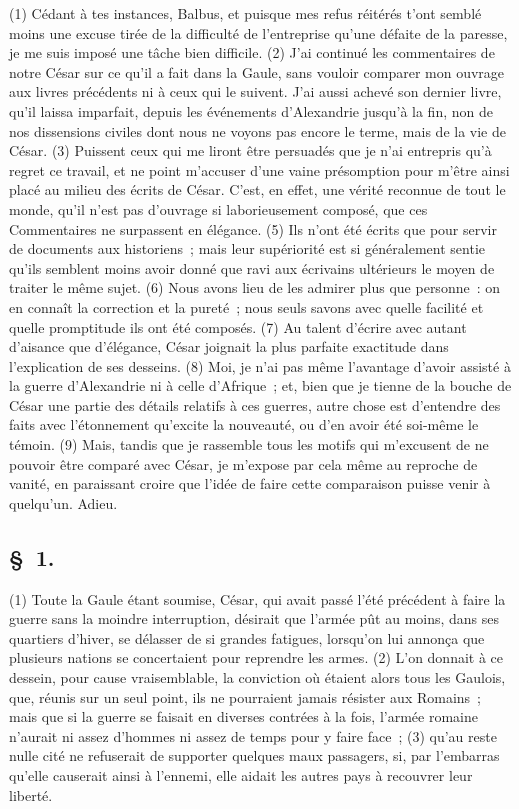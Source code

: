 \documentclass[french,twoside]{book} %
\begin{document}
\noindent (1) Cédant à tes instances, Balbus, et puisque mes refus réitérés t’ont semblé moins une excuse tirée de la difficulté de l’entreprise qu’une défaite de la paresse, je me suis imposé une tâche bien difficile. (2) J'ai continué les commentaires de notre César sur ce qu’il a fait dans la Gaule, sans vouloir comparer mon ouvrage aux livres précédents ni à ceux qui le suivent. J'ai aussi achevé son dernier livre, qu’il laissa imparfait, depuis les événements d’Alexandrie jusqu’à la fin, non de nos dissensions civiles dont nous ne voyons pas encore le terme, mais de la vie de César. (3) Puissent ceux qui me liront être persuadés que je n’ai entrepris qu’à regret ce travail, et ne point m’accuser d’une vaine présomption pour m’être ainsi placé au milieu des écrits de César. C'est, en effet, une vérité reconnue de tout le monde, qu’il n’est pas d’ouvrage si laborieusement composé, que ces Commentaires ne surpassent en élégance. (5) Ils n’ont été écrits que pour servir de documents aux historiens ; mais leur supériorité est si généralement sentie qu’ils semblent moins avoir donné que ravi aux écrivains ultérieurs le moyen de traiter le même sujet. (6) Nous avons lieu de les admirer plus que personne : on en connaît la correction et la pureté ; nous seuls savons avec quelle facilité et quelle promptitude ils ont été composés. (7) Au talent d’écrire avec autant d’aisance que d’élégance, César joignait la plus parfaite exactitude dans l’explication de ses desseins. (8) Moi, je n’ai pas même l’avantage d’avoir assisté à la guerre d’Alexandrie ni à celle d’Afrique ; et, bien que je tienne de la bouche de César une partie des détails relatifs à ces guerres, autre chose est d’entendre des faits avec l’étonnement qu’excite la nouveauté, ou d’en avoir été soi-même le témoin. (9) Mais, tandis que je rassemble tous les motifs qui m’excusent de ne pouvoir être comparé avec César, je m’expose par cela même au reproche de vanité, en paraissant croire que l’idée de faire cette comparaison puisse venir à quelqu’un. Adieu.\par
\subsection[{§ 1.}]{ \textsc{§ 1.} }
\noindent (1) Toute la Gaule étant soumise, César, qui avait passé l’été précédent à faire la guerre sans la moindre interruption, désirait que l’armée pût au moins, dans ses quartiers d’hiver, se délasser de si grandes fatigues, lorsqu’on lui annonça que plusieurs nations se concertaient pour reprendre les armes. (2) L'on donnait à ce dessein, pour cause vraisemblable, la conviction où étaient alors tous les Gaulois, que, réunis sur un seul point, ils ne pourraient jamais résister aux Romains ; mais que si la guerre se faisait en diverses contrées à la fois, l’armée romaine n’aurait ni assez d’hommes ni assez de temps pour y faire face ; (3) qu’au reste nulle cité ne refuserait de supporter quelques maux passagers, si, par l’embarras qu’elle causerait ainsi à l’ennemi, elle aidait les autres pays à recouvrer leur liberté.
\end{document}
